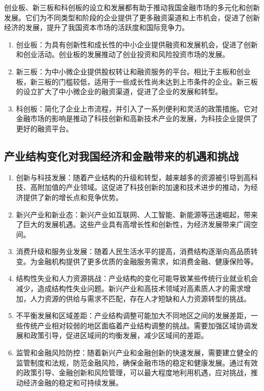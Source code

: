 \documentclass{article}
\begin{document}
创业板、新三板和科创板的设立和发展都有助于推动我国金融市场的多元化和创新发展。它们为不同类型和阶段的企业提供了更多融资渠道和上市机会，促进了创新经济的发展，提升了我国资本市场的活跃度和国际竞争力。
\begin{enumerate}
	\item 创业板：为具有创新性和成长性的中小企业提供融资和发展机会，促进了创新和创业活动。创业板的发展推动了创业投资和风险投资市场的发展。
	\item 新三板：为中小微企业提供股权转让和融资服务的平台。相比于主板和创业板，新三板的门槛较低，适用于一些成长性尚未达到上市条件的企业。新三板的设立扩大了中小微企业的融资渠道，促进了企业的发展和转型。
	\item 科创板：简化了企业上市流程，并引入了一系列便利和灵活的政策措施。它对金融市场的影响是推动了科技创新和高新技术产业的发展，为科技企业提供了更好的融资平台。
\end{enumerate}

\subsection{产业结构变化对我国经济和金融带来的机遇和挑战}

\begin{enumerate}
	\item 创新与科技发展：随着产业结构的升级和转型，越来越多的资源被引导到高科技、高附加值的产业领域。这促进了科技创新的加速和技术进步的推动，为经济提供了新的增长点和竞争优势。
	\item 新兴产业和新业态：新兴产业如互联网、人工智能、新能源等迅速崛起，带来了巨大的发展机遇。这些产业具有高增长性和创新性，为经济发展带来广阔空间。
	\item 消费升级和服务业发展：随着人民生活水平的提高，消费结构逐渐向高品质转变。为金融机构提供了更多优质的金融服务需求，如消费金融、健康保险等。
	\item 结构性失业和人力资源挑战：产业结构的变化可能导致某些传统行业就业机会减少，造成结构性失业问题。新兴产业和高技术领域对高素质人才的需求增加，人力资源的供给与需求不匹配，存在人才短缺和人力资源转型的挑战。
	\item 不平衡发展和区域差距：产业结构调整可能加大不同地区之间的发展差距，一些传统产业相对较弱的地区面临着产业结构调整的挑战。需要加强区域协调发展和政策引导，促进区域间的均衡发展，减少区域间的差距。
	\item 监管和金融风险防控：随着新兴产业和金融创新的快速发展，需要建立健全的监管制度和法规，防范金融风险，确保金融市场的稳定和健康发展。通过有效的政策引导、金融创新和风险管理，可以最大程度地利用机遇，应对挑战，推动经济金融的稳定和可持续发展。
\end{enumerate}
\end{document}
